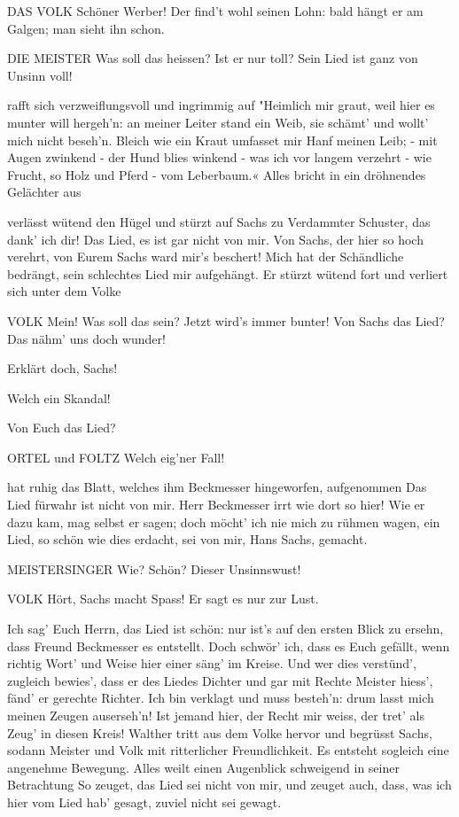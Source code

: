 \begin{drama}
DAS VOLK
Schöner Werber! Der find't wohl seinen Lohn:
bald hängt er am Galgen; man sieht ihn schon.

DIE MEISTER
Was soll das heissen?
Ist er nur toll?
Sein Lied ist ganz von Unsinn voll!

\Beckmesserspeaks
rafft sich verzweiflungsvoll und ingrimmig auf
"Heimlich mir graut,
weil hier es munter will hergeh'n:
an meiner Leiter stand ein Weib,
sie schämt' und wollt' mich nicht beseh'n.
Bleich wie ein Kraut
umfasset mir Hanf meinen Leib; -
mit Augen zwinkend - der Hund blies winkend -
was ich vor langem verzehrt -
wie Frucht, so Holz und Pferd -
vom Leberbaum.«
Alles bricht in ein dröhnendes Gelächter aus

\Beckmesserspeaks
verlässt wütend den Hügel und stürzt auf Sachs zu
Verdammter Schuster, das dank' ich dir!
Das Lied, es ist gar nicht von mir.
Von Sachs, der hier so hoch verehrt,
von Eurem Sachs ward mir's beschert!
Mich hat der Schändliche bedrängt,
sein schlechtes Lied mir aufgehängt.
Er stürzt wütend fort und verliert sich unter dem Volke

VOLK
Mein! Was soll das sein? Jetzt wird's immer bunter!
Von Sachs das Lied? Das nähm' uns doch wunder!

\Kothnerspeaks
Erklärt doch, Sachs!

\Nachtigallspeaks
Welch ein Skandal!

\Vogelgesangspeaks
Von Euch das Lied?

ORTEL und FOLTZ
Welch eig'ner Fall!

\Sachsspeaks
hat ruhig das Blatt, welches ihm Beckmesser hingeworfen, aufgenommen
Das Lied fürwahr ist nicht von mir.
Herr Beckmesser irrt wie dort so hier!
Wie er dazu kam, mag selbst er sagen;
doch möcht' ich nie mich zu rühmen wagen,
ein Lied, so schön wie dies erdacht,
sei von mir, Hans Sachs, gemacht.

MEISTERSINGER
Wie? Schön? Dieser Unsinnswust!

VOLK
Hört, Sachs macht Spass! Er sagt es nur zur Lust.

\Sachsspeaks
Ich sag' Euch Herrn, das Lied ist schön:
nur ist's auf den ersten Blick zu ersehn,
dass Freund Beckmesser es entstellt.
Doch schwör' ich, dass es Euch gefällt,
wenn richtig Wort' und Weise
hier einer säng' im Kreise.
Und wer dies verstünd', zugleich bewies',
dass er des Liedes Dichter
und gar mit Rechte Meister hiess',
fänd' er gerechte Richter.
Ich bin verklagt und muss besteh'n:
drum lasst mich meinen Zeugen auserseh'n!
Ist jemand hier, der Recht mir weiss,
der tret' als Zeug' in diesen Kreis!
Walther tritt aus dem Volke hervor und begrüsst Sachs, sodann Meister und Volk mit ritterlicher Freundlichkeit. Es entsteht sogleich eine angenehme Bewegung. Alles weilt einen Augenblick schweigend in seiner Betrachtung
So zeuget, das Lied sei nicht von mir,
und zeuget auch, dass, was ich hier
vom Lied hab' gesagt, zuviel nicht sei gewagt.


\end{drama}
